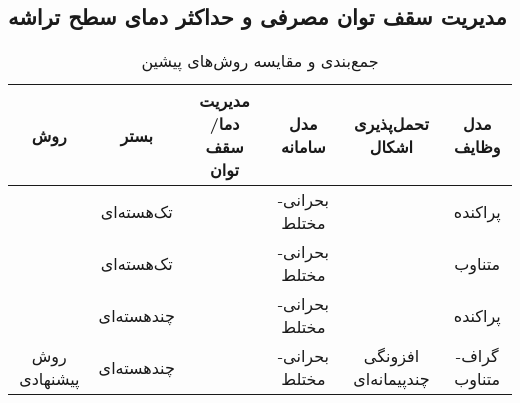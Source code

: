 \subsection{مدیریت سقف توان مصرفی و حداکثر دمای سطح تراشه}
\begin{table}[b!]
\caption{جمع‌بندی و مقایسه روش‌های پیشین }
	\centering
\begin{tabular}{||c|c|c|c|c|c||}
	\hline
	روش                                                                              & بستر        & مدیریت دما/سقف توان & مدل سامانه& تحمل‌پذیری اشکال    & مدل وظایف         \\ \hline
	\cite{Baruah2008}\cite{Vestal2007}\cite{Baruah2015}\cite{Ekberg2014}             & تک‌هسته‌ای  & \xmark              & بحرانی-مختلط                                                                       & \xmark                  & پراکنده      \\ \hline
	\cite{Su2013}                                                                    & تک‌هسته‌ای  & \xmark              & بحرانی-مختلط                                                                      & \xmark                  & متناوب            \\ \hline
	\cite{Li2012}                                                                    & چند‌هسته‌ای & \xmark              &بحرانی-مختلط                                                                      & \xmark                  & پراکنده     \\ \hline
		روش پیشنهادی                                                                     & چندهسته‌ای  & \cmark              & بحرانی-مختلط                                                                        & افزونگی چندپیمانه‌ای & گراف-متناوب              \\ \hline
\end{tabular}
\label{tab:survey}
\end{table}




 
